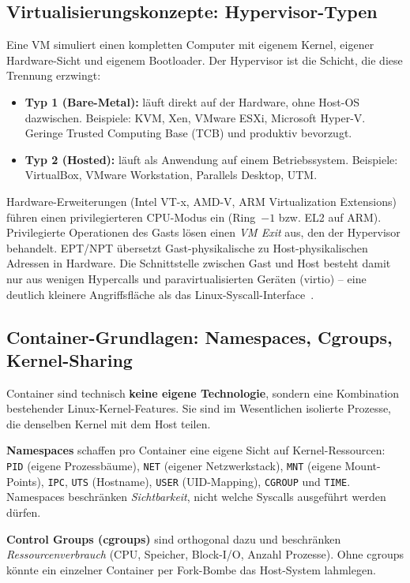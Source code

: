 \documentclass[conference]{IEEEtran}
\newcommand{\code}[1]{\texttt{\small #1}}
\begin{document}
\subsection{Virtualisierungskonzepte: Hypervisor-Typen}
Eine VM simuliert einen kompletten Computer mit eigenem Kernel, eigener
Hardware-Sicht und eigenem Bootloader. Der Hypervisor ist die Schicht, die
diese Trennung erzwingt:
\begin{itemize}
  \item \textbf{Typ 1 (Bare-Metal):} läuft direkt auf der Hardware, ohne Host-OS
        dazwischen. Beispiele: KVM, Xen, VMware ESXi, Microsoft Hyper-V.
        Geringe Trusted Computing Base (TCB) und produktiv bevorzugt.
  \item \textbf{Typ 2 (Hosted):} läuft als Anwendung auf einem Betriebssystem.
        Beispiele: VirtualBox, VMware Workstation, Parallels Desktop, UTM.
\end{itemize}
Hardware-Erweiterungen (Intel VT-x, AMD-V, ARM Virtualization Extensions)
führen einen privilegierteren CPU-Modus ein (\glqq Ring~$-1$\grqq{} bzw.
EL2 auf ARM). Privilegierte Operationen des Gasts lösen einen
\textit{VM Exit} aus, den der Hypervisor behandelt. EPT/NPT übersetzt
Gast-physikalische zu Host-physikalischen Adressen in Hardware. Die
Schnittstelle zwischen Gast und Host besteht damit nur aus wenigen Hypercalls
und para\-virtualisierten Geräten (virtio) -- eine deutlich kleinere
Angriffsfläche als das Linux-Syscall-Interface~\cite{b_vm_container_compare}.

\subsection{Container-Grundlagen: Namespaces, Cgroups, Kernel-Sharing}
Container sind technisch \textbf{keine eigene Technologie}, sondern eine
Kombination bestehender Linux-Kernel-Features. Sie sind im Wesentlichen
isolierte Prozesse, die denselben Kernel mit dem Host teilen.

\textbf{Namespaces} schaffen pro Container eine eigene Sicht auf Kernel-Ressourcen:
\code{PID} (eigene Prozessbäume), \code{NET} (eigener Netzwerkstack), \code{MNT}
(eigene Mount-Points), \code{IPC}, \code{UTS} (Hostname), \code{USER} (UID-Mapping),
\code{CGROUP} und \code{TIME}. Namespaces beschränken \textit{Sichtbarkeit}, nicht
welche Syscalls ausgeführt werden dürfen.

\textbf{Control Groups (cgroups)} sind orthogonal dazu und beschränken
\textit{Ressourcenverbrauch} (CPU, Speicher, Block-I/O, Anzahl Prozesse). Ohne
cgroups könnte ein einzelner Container per Fork-Bombe das Host-System lahm\-legen.
\end{document}
